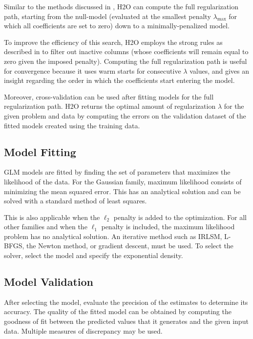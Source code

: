 Similar to the methods discussed in , H2O can compute the full regularization path, starting
from the null-model (evaluated at the smallest penalty $\lambda_{\max}$ for which all coefficients are set to zero) down to a minimally-penalized model. 

To improve the efficiency of this search, 
H2O employs the strong rules as described in  to filter out inactive columns (whose coefficients will remain equal to zero given the imposed penalty). Computing the full regularization path is useful for convergence because it uses warm starts for consecutive $\lambda$ values, and gives an insight regarding the order in which the coefficients start entering the model. 

Moreover, cross-validation can be used after fitting models for the full regularization path. H2O returns the optimal amount of regularization $\lambda$ for the given problem and data by computing the errors on the validation dataset of the fitted models created using the training data.

\newpage
\subsection{Model Fitting}
GLM models are fitted by finding the set of parameters that maximizes the likelihood of the data. For the Gaussian family, maximum likelihood consists of minimizing the mean squared error. This has an analytical solution and can be solved with a standard method of least squares. 

This is also applicable when the $\ell_2$ penalty is added to the optimization.  For all other families and when the $\ell_1$ penalty is included, the maximum likelihood problem has no analytical solution. An iterative method such as IRLSM, L-BFGS, the Newton method, or gradient descent, must be used. To select the solver, select the model and specify the exponential density. 


\subsection{Model Validation}

After selecting the model, evaluate the precision of the estimates to determine its accuracy. The quality of the fitted model can be obtained by computing the goodness of fit between the predicted values that it generates and the given input data. Multiple measures of discrepancy may be used. 
\nowidow[3]

